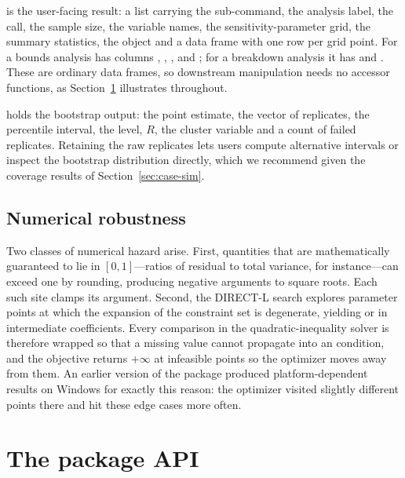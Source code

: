 \documentclass[article]{jss}\usepackage[]{graphicx}\usepackage[]{xcolor}
\begin{document}
 is the user-facing result: a list carrying the
sub-command, the analysis label, the call, the sample size, the variable
names, the sensitivity-parameter grid, the summary statistics, the
 object and a  data frame with one row per
grid point. For a bounds analysis  has columns
, , ,  and ; for a
breakdown analysis it has  and . These are
ordinary data frames, so downstream manipulation needs no accessor
functions, as Section~\ref{sec:api} illustrates throughout.

 holds the bootstrap output: the point estimate,
the vector of replicates, the percentile interval, the level, $R$, the
cluster variable and a count of failed replicates. Retaining the raw
replicates lets users compute alternative intervals or inspect the
bootstrap distribution directly, which we recommend given the coverage
results of Section~\ref{sec:case-sim}.

\subsection{Numerical robustness}

Two classes of numerical hazard arise. First, quantities that are
mathematically guaranteed to lie in $[0, 1]$---ratios of residual to total
variance, for instance---can exceed one by rounding, producing negative
arguments to square roots. Each such site clamps its argument. Second, the
DIRECT-L search explores parameter points at which the expansion of the
constraint set is degenerate, yielding  or  in
intermediate coefficients. Every comparison in the quadratic-inequality
solver is therefore wrapped so that a missing value cannot propagate into
an  condition, and the objective returns $+\infty$ at infeasible
points so the optimizer moves away from them. An earlier version of the
package produced platform-dependent results on Windows for exactly this
reason: the optimizer visited slightly different points there and hit these
edge cases more often.

\section{The package API}\label{sec:api}
\end{document}
